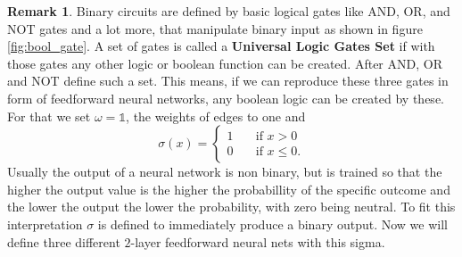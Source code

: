 \documentclass{article}
\theoremstyle{definition}
\newtheorem{remark}[theorem]{Remark}
\begin{document}
\begin{remark}
Binary circuits are defined by basic logical gates like AND, OR, and NOT gates and a lot more, that manipulate binary input as shown in figure \ref{fig:bool_gate}. A set of gates is called a \textbf{Universal Logic Gates Set} if with those gates any other logic or boolean function can be created. After \cite{quine1955way} AND, OR and NOT define such a set. This means, if we can reproduce these three gates in form of feedforward neural networks, any boolean logic can be created by these. For that we set $\omega=\mathds{1}$, the weights of edges to one and
\[ \sigma(x) = 
  \begin{cases}
    1       & \quad \text{if } x > 0\\
    0  		& \quad \text{if } x \leq 0.
  \end{cases}
\]
Usually the output of a neural network is non binary, but is trained so that the higher the output value is the higher the probabillity of the specific outcome and the lower the output the lower the probability, with zero being neutral. To fit this interpretation $\sigma$ is defined to immediately produce a binary output. Now we will define three different $2$-layer feedforward neural nets with this sigma.



\end{remark}
\end{document}
